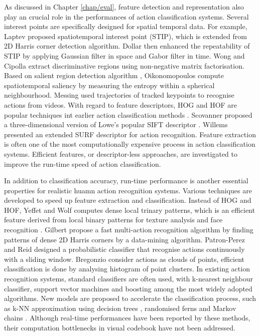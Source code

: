 As discussed in Chapter \ref{chap/eval}, feature detection and representation also play an crucial role in the performances of action classification systems. Several interest points are specifically designed for spatial temporal data. For example, Laptev \cite{Laptev2005} proposed spatiotemporal interest point (STIP), which is extended from 2D Harris corner detection algorithm. Dollar \etal \cite{Dollar2005} then enhanced the repeatability of STIP by applying Gaussian filter in space and Gabor filter in time.  
Wong and Cipolla \cite{Wong2007a} extract discriminative regions using non-negative matrix factorisation.
Based on salient region detection algorithm \cite{Mikolajczyk2004}, Oikonomopoulos \etal \cite{Oikonomopoulos2005} compute spatiotemporal saliency by measuring the entropy within a spherical neighbourhood. Messing \etal \cite{Messing2009} used trajectories of tracked keypoints to recognise actions from videos. 
With regard to feature descriptors, HOG and HOF are popular techniques int earlier action classification methods \cite{Dollar2005, Niebles2008, Schuldt2004}. Scovanner \etal \cite{Scovanner2007} proposed a three-dimensional version of Lowe's popular SIFT descriptor \cite{Lowe2004}. Willems \etal \cite{Willems2009} presented an extended SURF descriptor for action recognition.  
Feature extraction is often one of the most computationally expensive process in action classification systems. Efficient features, or descriptor-less approaches, are investigated to improve the run-time speed of action classification.  

In addition to classification accuracy, run-time performance is another essential properties for realistic huamn action recognition systems. Various techniques are developed to speed up feature extraction and classification. 
Instead of HOG and HOF, Yeffet and Wolf \cite{Yeffet2009} computes dense local trinary patterns, which is an efficient feature derived from local binary patterns for texture analysis and face recognition \cite{Ahonen2006}. 
Gilbert \etal \cite{Gilbert2009} propose a fast multi-action recognition algorithm by finding patterns of dense 2D Harris corners by a data-mining algorithm.
Patron-Perez and Reid \cite{Patron2007} designed a probabilistic classifier that recognise actions continuously with a sliding window. 
Bregonzio \etal \cite{Bregonzio2009} consider actions as clouds of points, efficient classification is done by analysing histogram of point clusters. 
In existing action recognition systems, standard classifiers are often used, with k-nearest neighbour classifier, support vector machines and boosting among the most widely adopted algorithms. New models are proposed to accelerate the classification process, such as k-NN approximation using decision trees \cite{Lin2009}, randomised ferns \cite{Oshin2009} and Markov chains \cite{Messing2009}.   
Although real-time performances have been reported by these methods, their computation bottlenecks in visual codebook have not been addressed. 

